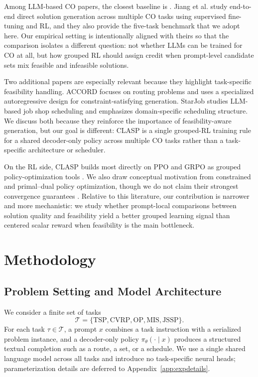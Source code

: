 \documentclass{article}
\theoremstyle{remark}
\begin{document}
Among LLM-based CO papers, the closest baseline is \citet{jiang2025endtoendco}. Jiang et al. study end-to-end direct solution generation across multiple CO tasks using supervised fine-tuning and RL, and they also provide the five-task benchmark that we adopt here. Our empirical setting is intentionally aligned with theirs so that the comparison isolates a different question: not whether LLMs can be trained for CO at all, but how grouped RL should assign credit when prompt-level candidate sets mix feasible and infeasible solutions.

Two additional papers are especially relevant because they highlight task-specific feasibility handling. ACCORD \citep{abgaryan2025accord} focuses on routing problems and uses a specialized autoregressive design for constraint-satisfying generation. StarJob \citep{abgaryan2025starjob} studies LLM-based job shop scheduling and emphasizes domain-specific scheduling structure. We discuss both because they reinforce the importance of feasibility-aware generation, but our goal is different: CLASP is a single grouped-RL training rule for a shared decoder-only policy across multiple CO tasks rather than a task-specific architecture or scheduler.

On the RL side, CLASP builds most directly on PPO and GRPO as grouped policy-optimization tools \citep{schulman2017ppo, shao2024deepseekmath}. We also draw conceptual motivation from constrained and primal--dual policy optimization, though we do not claim their strongest convergence guarantees \citep{achiam2017cpo, tessler2019rcpo, stooke2020pid, dai2024saferlhf}. Relative to this literature, our contribution is narrower and more mechanistic: we study whether prompt-local comparisons between solution quality and feasibility yield a better grouped learning signal than centered scalar reward when feasibility is the main bottleneck.

\section{Methodology}
\label{sec:method}
\subsection{Problem Setting and Model Architecture}
We consider a finite set of tasks
\[
\mathcal{T}=\{\mathrm{TSP},\mathrm{CVRP},\mathrm{OP},\mathrm{MIS},\mathrm{JSSP}\}.
\]
For each task \(\tau \in \mathcal{T}\), a prompt \(x\) combines a task instruction with a serialized problem instance, and a decoder-only policy \(\pi_\theta(\cdot\mid x)\) produces a structured textual completion such as a route, a set, or a schedule. We use a single shared language model across all tasks and introduce no task-specific neural heads; parameterization details are deferred to Appendix~\ref{app:expdetails}.
\end{document}
